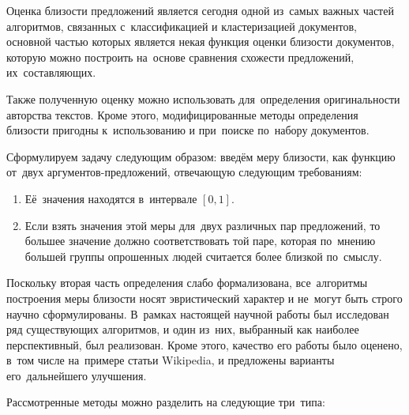 Оценка близости предложений является сегодня одной из~самых важных частей алгоритмов,
 связанных с~классификацией и кластеризацией документов\cite{textminingsurvey}, 
основной частью которых является некая функция оценки близости документов,
которую можно построить на~основе сравнения схожести предложений, их~составляющих.

Также полученную оценку можно использовать для~определения оригинальности
авторства текстов.
Кроме этого, модифицированные методы определения близости пригодны к~использованию и при~поиске по~набору документов.

Сформулируем задачу следующим образом:
введём меру близости, как функцию от~двух аргументов-предложений, отвечающую следующим требованиям:

\begin{enumerate}

\item {
Её~значения находятся в~интервале $[0,1]$.
}

\item {
Если взять значения этой меры для~двух различных пар предложений, 
то большее значение должно соответствовать той паре, которая по~мнению большей группы опрошенных людей считается более близкой по~смыслу.
}

\end{enumerate}

Поскольку вторая часть определения слабо формализована, 
все~алгоритмы построения меры близости носят эвристический характер и не~могут быть строго научно сформулированы.
В~рамках настоящей научной работы был исследован ряд существующих алгоритмов,
и один из~них, выбранный как наиболее перспективный, был реализован.
Кроме этого, качество его работы было оценено, в~том числе на~примере статьи Wikipedia, 
и предложены варианты его~дальнейшего улучшения.

Рассмотренные методы можно разделить на следующие три~типа:

